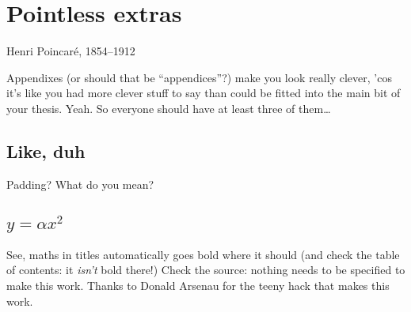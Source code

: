 \documentclass[../ms.tex]{subfiles}
\begin{document}
\chapter{Pointless extras}
\label{app:Pointless}

%
{Henri Poincar\'e, 1854--1912}

Appendixes (or should that be ``appendices''?) make you look really clever, 'cos
it's like you had more clever stuff to say than could be fitted into the main
bit of your thesis. Yeah. So everyone should have at least three of them\dots

\section{Like, duh}
\label{sec:Duh}
Padding? What do you mean?

\section{$y = \alpha x^2$}
\label{sec:EqnTitle}
See, maths in titles automatically goes bold where it should (and check the
table of contents: it \emph{isn't} bold there!) Check the source: nothing
needs to be specified to make this work. Thanks to Donald Arsenau for the
teeny hack that makes this work.

%
\end{document}

